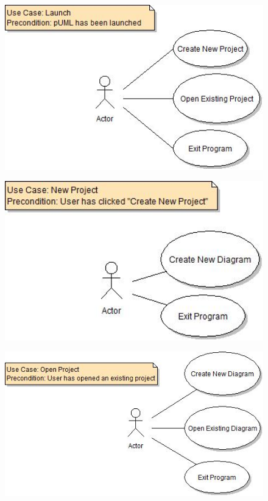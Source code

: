 \documentclass[twoside,letterpaper]{article}
\begin{document}
\bigskip
\bigskip

\begin{figure}[h]
\centering
\includegraphics[width=6.0in]{ucaseLaunch.jpg}
\end{figure}

\begin{figure}[h]
\centering
\includegraphics[width=6.0in]{ucaseNewProj.jpg}
\end{figure}

\begin{figure}[h]
\centering
\includegraphics[width=6.0in]{ucaseOpenProj.jpg}
\end{figure}
\end{document}
